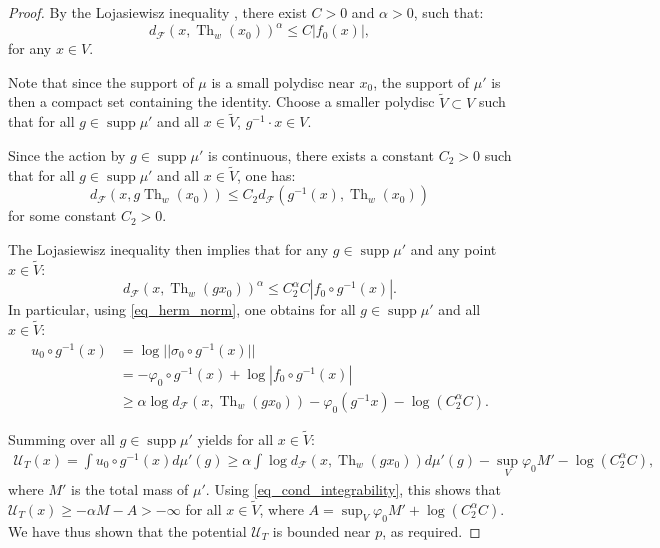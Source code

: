 \documentclass[12pt]{amsbook}%
\theoremstyle{definition}
\theoremstyle{remark}
\numberwithin{section}{chapter}
\numberwithin{subsection}{section}
\numberwithin{figure}{chapter}
\DeclareMathOperator{\Th}{Th}
\DeclareMathOperator{\Opp}{Opp}
\DeclareMathOperator{\supp}{supp}
\def\cF{{\mathscr{F}}}
\def\kap{}
\begin{document}
{{\begin{proof}
By the Lojasiewisz inequality \cite{Lojasiewicz}, there exist $C>0$ and $\alpha > 0$, such that: 
\begin{equation*} %
d_{\cF}(x, \Th_w(x_0))^\alpha \leqslant C |f_0(x)|, 
\end{equation*}  
for any $x\in V $.

Note that since the support of $\mu$ is a small polydisc near $x_0$, the support of $\mu'$ is then a compact set containing the identity. Choose a smaller polydisc $\tilde{V} \subset V$ such that for all $g\in \supp \mu'$ and all $x\in \tilde{V}$, $g^{-1} \cdot x \in V$. 

Since the action by $g\in\supp \mu'$ is continuous, there exists a constant $C_2>0$ such that
for all $g \in  \supp \mu'$ and all $x\in \tilde{V}$, one has:  
 $$d_{\cF}(x, g \Th_w(x_0)) \leqslant C_2 d_{\cF}(g^{-1}(x), \Th_w(x_0)) $$ for some constant $C_2> 0$.

The Lojasiewisz inequality then implies that for any $g \in  \supp \mu'$ and any point $x \in \tilde{V}$: 
  \begin{equation*}
  d_{\cF}(x, \Th_w(g x_0))^\alpha \leqslant C_2^\alpha C |f_0 \circ g^{-1} (x)|.  
\end{equation*}
In particular, using \eqref{eq_herm_norm}, one obtains for all $g\in \supp \mu'$ and all $x\in \tilde{V}$:
\begin{align*}
u_0 \circ g^{-1}(x) &= \log ||\sigma_0 \circ g^{-1}(x)|| \\
 & = - \varphi_0 \circ g^{-1} (x) + \log |f_0 \circ g^{-1}(x)| \\
  & \geqslant 
\alpha \log d_{\cF}(x, \Th_w(g x_0)) - \varphi_0(g^{-1} x) -  \log(C_2^\alpha C) .
\end{align*}
  
Summing over  all $ g\in  \supp \mu'$ yields for all $x\in \tilde{V}$: 
\begin{multline*}
\mathcal{U}_T(x) = \int u_0 \circ g^{-1}(x) d\mu'(g)  \geqslant \alpha \int{ \log} d_{\cF} (x, \Th_w(gx_0)) d\mu'(g) - \sup_{V} \varphi_0 M' - \log (C_2^\alpha C), 
\end{multline*}
where $M'$ is the total mass of $\mu'$.
Using \eqref{eq_cond_integrability}, this shows that 
$\mathcal{U}_T(x) \geqslant -\alpha M  - A > -\infty$  for all $x\in \tilde{V}$, 
where $A= \sup_V \varphi_0 M' + \log (C_2^\alpha C) $. 
We have thus shown that the potential  $\mathcal{U}_T$ is bounded near $p$, as required.
\end{proof}



}}
\end{document}
